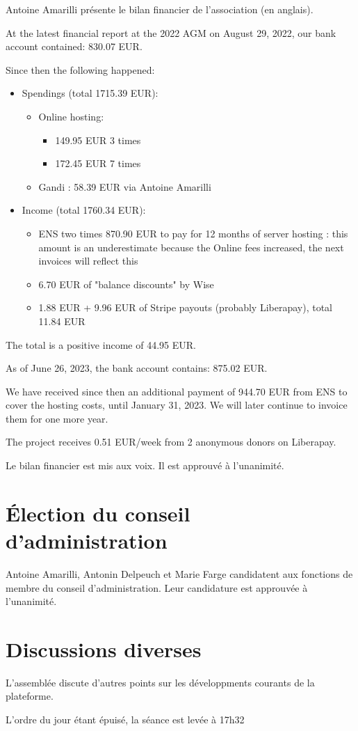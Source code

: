 \documentclass[a4paper]{article}
\begin{document}
Antoine Amarilli présente le bilan financier de l'association (en anglais).

At the latest financial report at the 2022 AGM on August 29, 2022, our bank account contained: 830.07 EUR.

Since then the following happened:

\begin{itemize}
  \item Spendings (total 1715.39 EUR):
\begin{itemize}
  \item Online hosting:
\begin{itemize}
  \item 149.95 EUR 3 times
      \item 172.45 EUR 7 times
\end{itemize}
    \item Gandi : 58.39 EUR via Antoine Amarilli
\end{itemize}

\item Income (total 1760.34 EUR):
  \begin{itemize}
    \item ENS two times 870.90 EUR to pay for 12 months of server hosting : this amount is an underestimate because the Online fees increased, the next invoices will reflect this
    \item 6.70 EUR of "balance discounts" by Wise
    \item 1.88 EUR + 9.96 EUR of Stripe payouts (probably Liberapay), total 11.84 EUR
  \end{itemize}
\end{itemize}

The total is a positive income of 44.95 EUR.

As of June 26, 2023, the bank account contains: 875.02 EUR.

We have received since then an additional payment of 944.70 EUR from ENS to cover the hosting costs, until January 31, 2023. We will later continue to invoice them for one more year.

The project receives 0.51 EUR/week from 2 anonymous donors on Liberapay.

Le bilan financier est mis aux voix. Il est approuvé à l'unanimité.

\section{Élection du conseil d'administration}

Antoine Amarilli, Antonin Delpeuch et Marie Farge candidatent aux fonctions de
membre du conseil d'administration. Leur candidature est approuvée à
l'unanimité.

\section{Discussions diverses}

L'assemblée discute d'autres points sur les développments courants de la
plateforme.

L'ordre du jour étant épuisé, la séance est levée à 17h32
\end{document}
